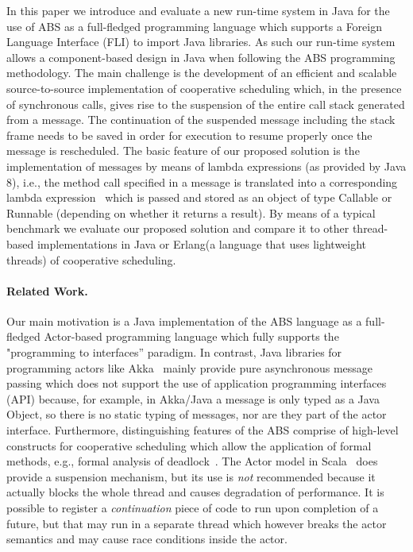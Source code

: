 In this paper we introduce and evaluate a new run-time system in Java for the use of ABS as a full-fledged programming language which supports a Foreign Language Interface (FLI) to import Java libraries. As such our run-time system allows a component-based design in Java when following the ABS programming methodology.
The main challenge is the development of an efficient and scalable source-to-source implementation of cooperative scheduling which, in the presence of synchronous calls, gives rise to the suspension of the entire call stack generated from a message.
The continuation of the suspended message including the stack frame needs to be saved in order for execution to resume properly once the message is rescheduled.
The basic feature of our proposed solution is the implementation of messages by means of lambda expressions (as provided by Java 8), i.e., the method call specified in a message
is translated into a corresponding lambda expression~\cite{lambdas} which is passed and stored as
an object of type Callable or Runnable (depending on whether it returns a result). 
By means of a typical benchmark we evaluate our proposed solution and compare it
to other thread-based implementations in Java or Erlang(a language that uses lightweight threads) of cooperative scheduling.

\paragraph{Related Work.} Our main motivation is a Java implementation of the ABS language as a full-fledged Actor-based programming language which fully supports the "programming to interfaces'' paradigm.
In contrast, Java libraries for programming actors like Akka~\cite{Akka} mainly provide pure asynchronous message passing which does not support the use of application programming interfaces (API) because, for example, in Akka/Java a message is only typed as a Java Object, so there is no static typing of messages, nor are they part of the actor interface.
Furthermore, distinguishing features of the ABS comprise of high-level constructs for cooperative scheduling which allow the application of formal methods, e.g.,
formal analysis of deadlock~\cite{deadlock}.
The Actor model in Scala~\cite{Scala} does provide a suspension mechanism, but its use is \emph{not} recommended because it actually blocks the whole thread and causes
degradation of performance.
It is possible to register a {\em continuation} piece of code to run upon completion of a future, but that may run in a separate thread which however breaks the actor semantics and may cause race conditions inside the actor.

